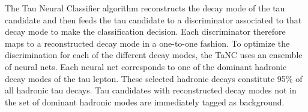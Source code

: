 The Tau Neural Classifier algorithm reconstructs the decay mode of the
tau candidate and then feeds the tau candidate to a discriminator associated
to that decay mode to make the classification decision.  Each discriminator
therefore maps to a reconstructed decay mode in a one-to-one fashion.  To
optimize the discrimination for each of the different decay modes, the TaNC uses
an ensemble of neural nets.  Each neural net corresponds to one of the dominant
hadronic decay modes of the tau lepton.  These selected hadronic decays
constitute 95\% of all hadronic tau decays.  Tau candidates with reconstructed
decay modes not in the set of dominant hadronic modes are immediately tagged as
background.  

